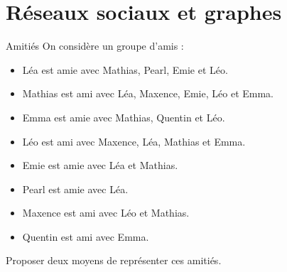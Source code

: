 \documentclass[a4paper, dvipsnames]{article}
\begin{document}
\section{Réseaux sociaux et graphes}


\begin{activite}{Amitiés}{}
  On considère un groupe d'amis :
  \begin{itemize}
    \item Léa est amie avec Mathias, Pearl, Emie et Léo.
    \item Mathias est ami avec Léa, Maxence, Emie, Léo et Emma.
    \item Emma est amie avec Mathias, Quentin et Léo.
    \item Léo est ami avec Maxence, Léa, Mathias et Emma.
    \item Emie est amie avec Léa et Mathias.
    \item Pearl est amie avec Léa.
    \item Maxence est ami avec Léo et Mathias.
    \item Quentin est ami avec Emma.
  \end{itemize}
  Proposer deux moyens de représenter ces amitiés.
\end{activite}

\bigskip
\end{document}
